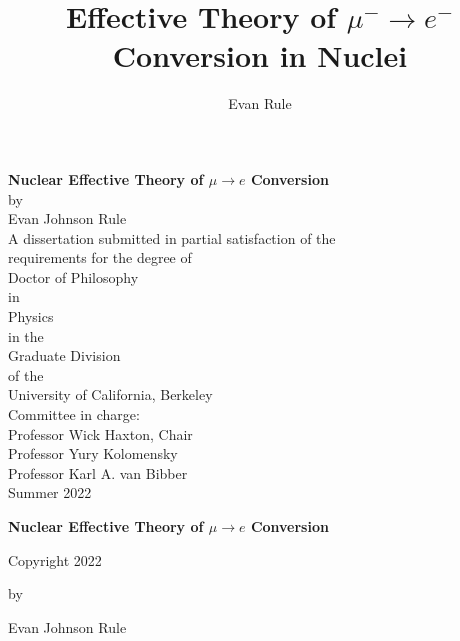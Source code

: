 \documentclass{book}[12pt]
\title{Effective Theory of $\mu^-\rightarrow e^-$ Conversion in Nuclei}
\author{Evan Rule}
\begin{document}
\begin{titlepage}
\begin{center}
\vspace*{1cm}
\textbf{Nuclear Effective Theory of $\mu\rightarrow e$ Conversion}\\
\vspace*{1cm}
by\\
\vspace*{0.5cm}
Evan Johnson Rule\\
\vspace*{1cm}
A dissertation submitted in partial satisfaction of the\\
\vspace*{0.25cm}
requirements for the degree of\\
\vspace*{0.25cm}
Doctor of Philosophy\\
\vspace*{0.25cm}
in\\
\vspace*{0.25cm}
Physics\\
\vspace*{0.25cm}
in the \\
\vspace*{0.25cm}
Graduate Division\\
\vspace*{0.25cm}
of the\\
\vspace*{0.25cm}
University of California, Berkeley\\
\vspace*{2cm}
Committee in charge:\\
\vspace*{1cm}
Professor Wick Haxton, Chair\\
\vspace*{0.25cm}
Professor Yury Kolomensky\\
\vspace*{0.25cm}
Professor Karl A. van Bibber\\
\vspace*{2cm}
Summer 2022
\end{center}
\end{titlepage}
\thispagestyle{plain}
\begin{center}
\textbf{Nuclear Effective Theory of $\mu\rightarrow e$ Conversion}

\vspace{4cm}
Copyright 2022

by

Evan Johnson Rule
\end{center}
\end{document}
